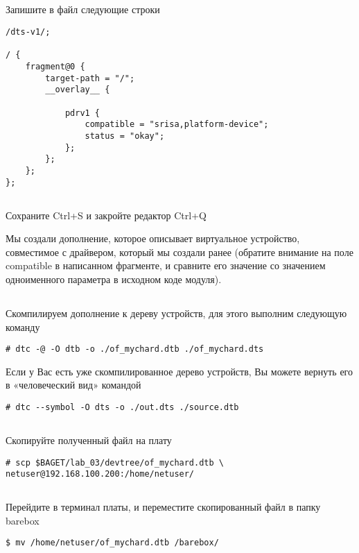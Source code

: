 \subsection{}Запишите в файл следующие строки
\begin{lstlisting}[style=stdout]
/dts-v1/;

/ {
	fragment@0 {
		target-path = "/";
		__overlay__ {
			
			pdrv1 {
				compatible = "srisa,platform-device";
				status = "okay";
			};
		};
	};
};
\end{lstlisting}

\subsection{}Сохраните Ctrl+S и закройте редактор Ctrl+Q

Мы создали дополнение, которое описывает виртуальное устройство, совместимое с драйвером, который мы создали ранее (обратите внимание на поле compatible в написанном фрагменте, и сравните его значение со значением одноименного параметра в исходном коде модуля). 

\subsection{}Скомпилируем дополнение к дереву устройств, для этого выполним следующую команду
\begin{lstlisting}[style=bash]
# dtc -@ -O dtb -o ./of_mychard.dtb ./of_mychard.dts
\end{lstlisting}

\vspace{5mm}
Если у Вас есть уже скомпилированное дерево устройств, Вы можете вернуть его в «человеческий вид» командой 
\begin{lstlisting}[style=bash]
# dtc --symbol -O dts -o ./out.dts ./source.dtb
\end{lstlisting}

\subsection{}Скопируйте полученный файл на плату
\begin{lstlisting}[style=bash]
# scp $BAGET/lab_03/devtree/of_mychard.dtb \
netuser@192.168.100.200:/home/netuser/
\end{lstlisting}

\subsection{}Перейдите в терминал платы, и переместите скопированный файл в папку barebox
\begin{lstlisting}[style=bash]
$ mv /home/netuser/of_mychard.dtb /barebox/
\end{lstlisting}

